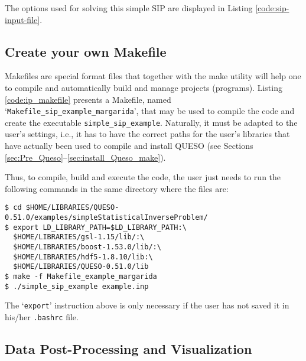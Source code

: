 The options used for solving this simple SIP are displayed in Listing \ref{code:sip-input-file}.





\subsection{Create your own Makefile}\label{sec:sip-makefile}

Makefiles are special format files that together with the make utility will help one to compile and automatically build and manage projects (programs).  
Listing \ref{code:ip_makefile} presents a Makefile, named `\texttt{Makefile\_sip\_example\_margarida}', that may be used to compile the code and create the executable \verb+simple_sip_example+. Naturally, it must be adapted to the user's settings, i.e., it has to have the correct paths for the user's libraries that have actually been used to compile and install QUESO  (see Sections \ref{sec:Pre_Queso}--\ref{sec:install_Queso_make}).



Thus, to compile, build and execute the code, the user just needs to run the following commands in the same directory where the files are:
\begin{lstlisting}
$ cd $HOME/LIBRARIES/QUESO-0.51.0/examples/simpleStatisticalInverseProblem/
$ export LD_LIBRARY_PATH=$LD_LIBRARY_PATH:\
  $HOME/LIBRARIES/gsl-1.15/lib/:\
  $HOME/LIBRARIES/boost-1.53.0/lib/:\
  $HOME/LIBRARIES/hdf5-1.8.10/lib:\
  $HOME/LIBRARIES/QUESO-0.51.0/lib 
$ make -f Makefile_example_margarida 
$ ./simple_sip_example example.inp
\end{lstlisting}

The `\verb+export+' instruction above is only necessary if the user has not saved it in his/her \verb+.bashrc+ file. 


\subsection{Data Post-Processing and Visualization}\label{sec:sip-results}


